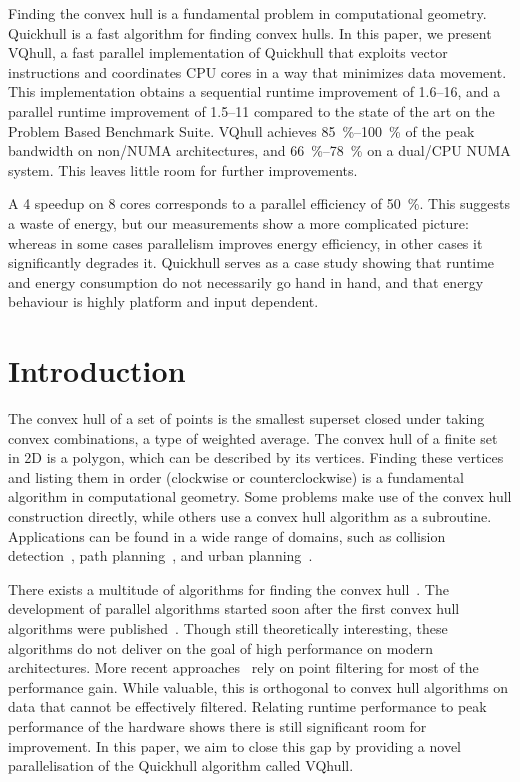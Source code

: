 Finding the convex hull is a fundamental problem in computational geometry.
Quickhull is a fast algorithm for finding convex hulls.
In this paper, we present VQhull, a fast parallel implementation of Quickhull that exploits vector instructions and coordinates CPU cores in a way that minimizes data movement.
This implementation obtains a sequential runtime improvement of \qtyrange{1.6}{16}{\times}, and a parallel runtime improvement of \qtyrange{1.5}{11}{\times} compared to the state of the art on the Problem Based Benchmark Suite.
VQhull achieves \qtyrange{85}{100}{\percent} of the peak bandwidth on non\-/NUMA architectures, and \qtyrange{66}{78}{\percent} on a dual\-/CPU NUMA system.
This leaves little room for further improvements.

A \qty{4}{\times} speedup on 8 cores corresponds to a parallel efficiency of \qty{50}{\percent}.
This suggests a waste of energy, but our measurements show a more complicated picture: whereas in some cases parallelism improves energy efficiency, in other cases it significantly degrades it.
Quickhull serves as a case study showing that runtime and energy consumption do not necessarily go hand in hand, and that energy behaviour is highly platform and input dependent.

\section{Introduction}
The convex hull of a set of points is the smallest superset closed under taking convex combinations, a type of weighted average.
The convex hull of a finite set in 2D is a polygon, which can be described by its vertices.
Finding these vertices and listing them in order (clockwise or counterclockwise) is a fundamental algorithm in computational geometry.
Some problems make use of the convex hull construction directly, while others use a convex hull algorithm as a subroutine.
Applications can be found in a wide range of domains, such as collision detection~\cite{tang2008collision}, path planning~\cite{meeran1997optimum}, and urban planning~\cite{kang2017measuring}.

There exists a multitude of algorithms for finding the convex hull~\cite{graham1972efficient,jarvis1973identification,eddy1977convex,preparata1977convex,bykat1978convex,akl1978fast,andrew1979another,clarkson1993four,barber1996quick,chan1996optimal}.
The development of parallel algorithms started soon after the first convex hull algorithms were published~\cite{nath1981parallel}.
Though still theoretically interesting, these algorithms do not deliver on the goal of high performance on modern architectures.
More recent approaches~\cite{masnadi2020concurrent} rely on point filtering for most of the performance gain.
While valuable, this is orthogonal to convex hull algorithms on data that cannot be effectively filtered.
Relating runtime performance to peak performance of the hardware shows there is still significant room for improvement.
In this paper, we aim to close this gap by providing a novel parallelisation of the Quickhull algorithm called VQhull.

